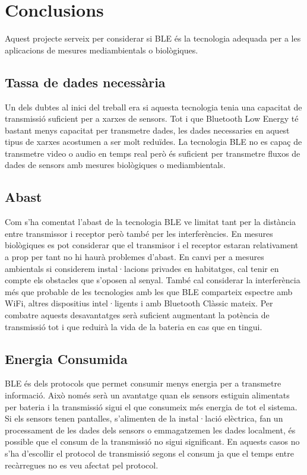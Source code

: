 \cleardoublepage
{}
\chapter*{Conclusions}

Aquest projecte serveix per considerar si BLE és la tecnologia adequada per a les aplicacions de mesures mediambientals o biològiques.

\section*{Tassa de dades necessària}

Un dels dubtes al inici del treball era si aquesta tecnologia tenia una capacitat de transmissió suficient per a xarxes de sensors.
Tot i que Bluetooth Low Energy té bastant menys capacitat per transmetre dades, les dades necessaries en aquest tipus de xarxes acostumen a ser molt reduïdes.
La tecnologia BLE  no es capaç de transmetre video o audio en temps real però és suficient per transmetre fluxos de dades de sensors amb mesures biològiques o mediambientals.

\section*{Abast}

Com s'ha comentat l'abast de la tecnologia BLE ve limitat tant per la distància entre transmissor i receptor però també per les interferències.
En mesures biològiques es pot considerar que el transmisor i el receptor estaran relativament a prop per tant no hi haurà problemes d'abast.
En canvi per a mesures ambientals si considerem instal·lacions privades en habitatges, cal tenir en compte els obstacles que s'oposen al senyal.
També cal considerar la interferència més que probable de les tecnologies amb les que BLE comparteix espectre amb WiFi, altres dispositius intel·ligents i amb Bluetooth Clàssic mateix.
Per combatre aquests desavantatges serà suficient augmentant la potència de transmissió tot i que reduirà la vida de la bateria en cas que en tingui.

\section*{Energia Consumida}

BLE és dels protocols que permet consumir menys energia per a transmetre informació.
Això només serà un avantatge quan els sensors estiguin alimentats per bateria i la transmissió sigui el que consumeix més energia de tot el sistema.
Si els sensors tenen pantalles, s'alimenten de la instal·lació elèctrica, fan un processament de les dades dels sensors o emmagatzemen les dades localment, és possible que el consum de la transmissió no sigui significant.
En aquests casos no s'ha d'escollir el protocol de transmissió segons el consum ja que el temps entre recàrregues no es veu afectat pel protocol.


